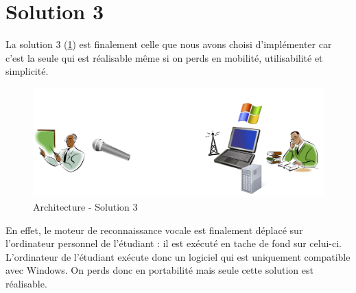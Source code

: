 \section{Solution 3}
La solution 3 (\ref{fig:solution3}) est finalement celle que nous avons choisi d'implémenter car c'est la seule qui est réalisable même si on perds en mobilité, utilisabilité et simplicité.


\begin{figure}[h]
 \centering
 \includegraphics[scale=0.5]{./img/solution3.png}
 \caption{Architecture - Solution 3}
 \label{fig:solution3}
\end{figure}


En effet, le moteur de reconnaissance vocale est finalement déplacé sur l'ordinateur personnel de l'étudiant : il est exécuté en tache de fond sur celui-ci. L'ordinateur de l'étudiant exécute donc un logiciel qui est uniquement compatible avec Windows. On perds donc en portabilité mais seule cette solution est réalisable.

